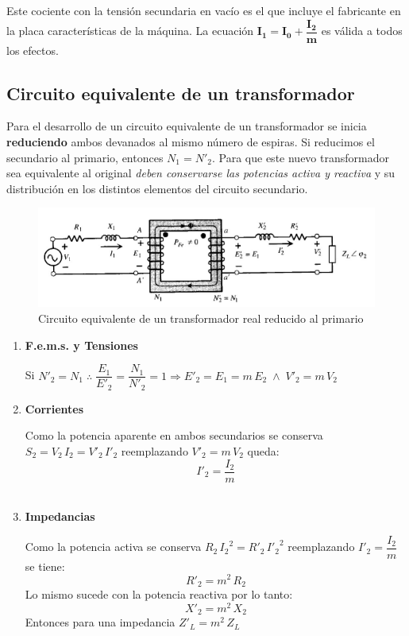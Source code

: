 Este cociente con la tensión secundaria en vacío es el que incluye el fabricante en la placa características de la máquina. La ecuación $\mathbf{I_{1}=I_{0}+\dfrac{I_{2}}{m}}$ es válida a todos los efectos.

\subsection{Circuito equivalente de un transformador}
Para el desarrollo de un circuito equivalente de un transformador se inicia \textbf{reduciendo} ambos devanados al mismo número de espiras. Si reducimos el secundario al primario, entonces $N_{1}=N'_{2}$. Para que este nuevo transformador sea equivalente al original \textit{deben conservarse las potencias activa y reactiva} y su distribución en los distintos elementos del circuito secundario. 
 \begin{figure}[H]
	\centering
	\includegraphics[width=0.8\linewidth]{"../Figuras/18"}
	\caption{Circuito equivalente de un transformador real reducido al primario}
\end{figure} 

\begin{enumerate}[label=\textbf{\alph*)}]
	\item \textbf{F.e.m.s. y Tensiones}
	
	Si $N'_{2}=N_{1} \; \therefore \; \dfrac{E_{1}}{E'_{2}}=\dfrac{N_{1}}{N'_{2}}=1 \Rightarrow \boxed{E'_{2}=E_{1}=m \, E_{2} \; \wedge \; V'_{2}=m \, V_{2}}$\\
	
	\item \textbf{Corrientes}
	
	
	Como la potencia aparente en ambos secundarios se conserva $S_{2}=V_{2}\, I_{2}=V'_{2}\, I'_{2}$ reemplazando $V'_{2}=m \, V_{2}$ queda:
	\begin{equation}
		I'_{2}=\dfrac{I_{2}}{m}
	\end{equation} \\

	\item \textbf{Impedancias}
	
	
	Como la potencia activa se conserva $R_{2}\, {I_{2}}^{2} = R'_{2} \, {I'_{2}}^{2}$ reemplazando $I'_{2}=\dfrac{I_{2}}{m}$ se tiene:
	\begin{equation}
		R'_{2}=m^{2}\, R_{2}
	\end{equation}
	Lo mismo sucede con la potencia reactiva por lo tanto:
	\begin{equation}
		X'_{2}=m^{2}\, X_{2}
	\end{equation}
	Entonces para una impedancia $Z'_{L}=m^{2}\, Z_{L}$
\end{enumerate}

